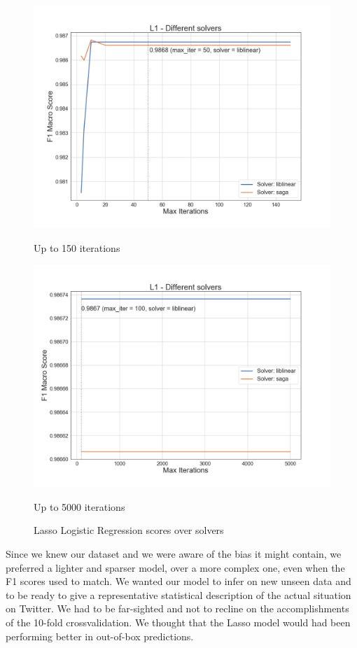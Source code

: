 \begin{figure}
	\begin{multicols}{2}
		\includegraphics[width=\linewidth]{chapter5/figure/logreg_l1_close.png}\par 
		\caption{Up to 150 iterations}
		\label{fig:lr_lasso_close}
		\includegraphics[width=\linewidth]{chapter5/figure/logreg_l1_far.png}\par 
		\caption{Up to 5000 iterations}
		\label{fig:lr_lasso_far}
	\end{multicols}
	\caption{Lasso Logistic Regression scores over solvers}
\end{figure}

Since we knew our dataset and we were aware of the bias it might contain, we preferred a lighter and sparser model, over a more complex one, even when the F1 scores used to match. We wanted our model to infer on new unseen data and to be ready to give a representative statistical description of the actual situation on Twitter.
We had to be far-sighted and not to recline on the accomplishments of the 10-fold crossvalidation. We thought that the Lasso model would had been performing better in out-of-box predictions.

